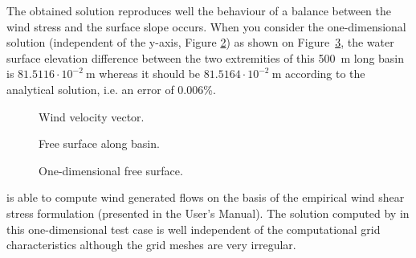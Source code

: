 \bigskip
The obtained  solution reproduces well the behaviour of a balance 
between the wind stress and the surface slope occurs. 
When you consider the one-dimensional solution (independent of the y-axis, 
Figure \ref{t2d:wind:fig:freeSbasin}) as shown on Figure~\ref{t2d:wind:fig:freeS1d}, 
the water surface elevation difference between 
the two extremities of this 500~m long basin is $81.5116\cdot 10^{-2}~\text{m}$ 
whereas it should be $81.5164\cdot 10^{-2}~\text{m}$ according to the analytical 
solution, i.e. an error of 0.006\%. %


\begin{figure}[!htbp]
 \centering
 \caption{Wind velocity vector.}
 \label{t2d:wind:fig:windvelo}
\end{figure}
\begin{figure}[!htbp]
 \centering
 \caption{Free surface along basin.}
 \label{t2d:wind:fig:freeSbasin}
\end{figure}

\begin{figure}[!htbp]
 \centering
 \caption{One-dimensional free surface.}
 \label{t2d:wind:fig:freeS1d}
\end{figure}

\bigskip
{} is able to compute wind generated flows on the basis of 
the empirical wind shear stress formulation  (presented in the User's Manual). 
The solution computed by  in this one-dimensional test case is well independent 
of the computational grid characteristics although the grid meshes are very irregular.

